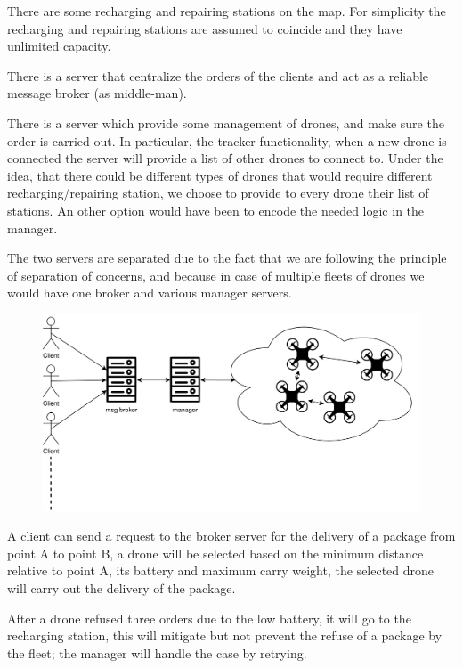 \documentclass[a4paper, oneside]{memoir}
\begin{document}
There are some recharging and repairing stations on the map. For simplicity the recharging and repairing stations are assumed to coincide and they have unlimited capacity.

There is a server that centralize the orders of the clients and act as a reliable message broker (as middle-man).

There is a server which provide some management of drones, and make sure the order is carried out. In particular, the tracker functionality, when a new drone is connected the server will provide a list of other drones to connect to. Under the idea, that there could be different types of drones that would require different recharging/repairing station, we choose to provide to every drone their list of stations. An other option would have been to encode the needed logic in the manager.

The two servers are separated due to the fact that we are following the principle of separation of concerns, and because in case of multiple fleets of drones we would have one broker and various manager servers.

\begin{figure}[h!]
	\centering
	\includegraphics[width=\linewidth]{Overview}
\end{figure}

A client can send a request to the broker server for the delivery of a package from point A to point B, a drone will be selected based on the minimum distance relative to point A, its battery and maximum carry weight, the selected drone will carry out the delivery of the package.

After a drone refused three orders due to the low battery, it will go to the recharging station, this will mitigate but not prevent the refuse of a package by the fleet; the manager will handle the case by retrying.
\end{document}
